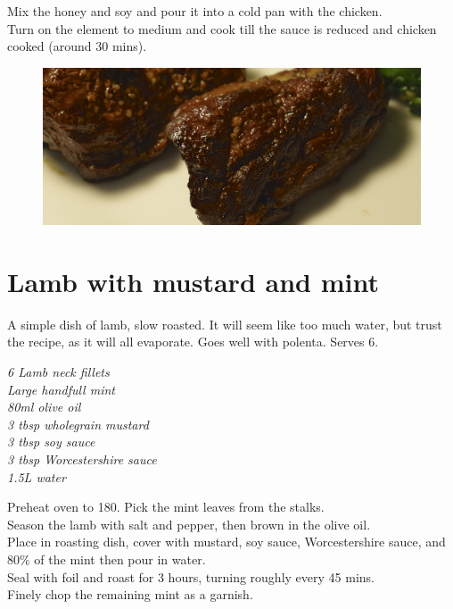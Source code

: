 \documentclass{tufte-book}
\begin{document}
\smallskip
Mix the honey and soy and pour it into a cold pan with the chicken.
\\Turn on the element to medium and cook till the sauce is reduced and chicken cooked (around 30 mins).

\newpage

\begin{figure}[h]
  \includegraphics[width=\linewidth]{lambwithmint.png}
\end{figure}

\section{Lamb with mustard and mint}

A simple dish of lamb, slow roasted. It will seem like too much water, but trust the recipe, as it will all evaporate. Goes well with polenta. Serves 6.

\smallskip
\emph{6 Lamb neck fillets
\\Large handfull mint
\\80ml olive oil
\\3 tbsp wholegrain mustard
\\3 tbsp soy sauce
\\3 tbsp Worcestershire sauce
\\1.5L water}

\smallskip
Preheat oven to 180\celsius. Pick the mint leaves from the stalks. 
\\Season the lamb with salt and pepper, then brown in the olive oil.
\\Place in roasting dish, cover with mustard, soy sauce, Worcestershire sauce, and 80\% of the mint then pour in water. 
\\Seal with foil and roast for 3 hours, turning roughly every 45 mins.
\\Finely chop the remaining mint as a garnish.
\end{document}
